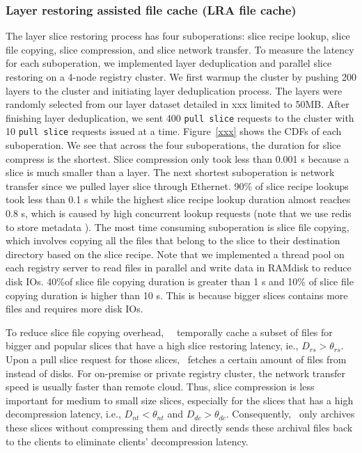 \subsubsection{Layer restoring assisted file cache (LRA file cache)}

The layer slice restoring process has four suboperations: 
slice recipe lookup,
slice file copying,
slice compression, and
slice network transfer. 
To measure the latency for each suboperation, we implemented layer deduplication and parallel slice
restoring on a 4-node registry cluster. 
We first warmup the cluster by pushing 200 layers to the cluster
and initiating layer deduplication process.
The layers were randomly selected from our layer dataset detailed in xxx limited to 50MB.
After finishing layer deduplication,
we sent 400 \texttt{pull slice} requests to the cluster with 10 \texttt{pull slice} requests issued at a time.
Figure~\ref{xxx} shows the CDFs of each suboperation.
We see that across the four suboperations,
the duration for slice compress is the shortest.
Slice compression only took less than 0.001 s because a slice is much smaller than a layer. 
The next shortest suboperation is network transfer since we pulled layer slice through Ethernet.
90\% of slice recipe lookups took less than 0.1 s while 
the highest slice recipe lookup duration almost reaches 0.8 s,
which is caused by high concurrent lookup requests 
(note that we use redis to store metadata ).
The most time consuming suboperation is slice file copying, which involves 
copying all 
the files that belong to the slice to their destination directory based on the slice recipe.
Note that we implemented a thread pool on each registry server to read files in parallel
and write data in RAMdisk to reduce disk IOs.
40\%of slice file copying duration is greater than 1 s and 
10\% of slice file copying duration is higher than 10 s.
This is because bigger slices contains more files and requires more disk IOs.



To reduce slice file copying overhead,
\sysname~\filecachename~temporally cache a subset of files for bigger and popular slices that have a high slice restoring latency, ie., $D_{rs} > \theta_{rs}$. 
Upon a pull slice request for those slices, 
\dedupname~fetches a certain amount of files from \filecachename~
instead of disks.
For on-premise or private registry cluster, the network transfer speed is usually faster than remote cloud.
Thus, slice compression is less important for medium to small size slices, 
especially for the slices that has a high decompression latency, 
i.e., $D_{nt} < \theta_{nt}$ and $D_{dc} > \theta_{dc}$. 
Consequently, \dedupname~only archives these slices without compressing them and directly sends
these archival files back to the clients to eliminate clients' decompression latency.


